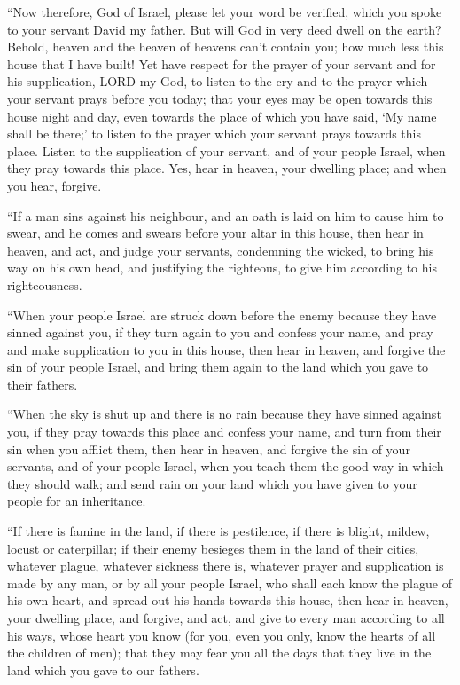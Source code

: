  ``Now therefore, God of Israel, please let your word be
verified, which you spoke to your servant David my father. 
But will God in very deed dwell on the earth? Behold, heaven and the
heaven of heavens can't contain you; how much less this house that I
have built!  Yet have respect for the prayer of your
servant and for his supplication, LORD my God, to listen to the cry and
to the prayer which your servant prays before you today; 
that your eyes may be open towards this house night and day, even
towards the place of which you have said, `My name shall be there;' to
listen to the prayer which your servant prays towards this place.
 Listen to the supplication of your servant, and of your
people Israel, when they pray towards this place. Yes, hear in heaven,
your dwelling place; and when you hear, forgive.

 ``If a man sins against his neighbour, and an oath is laid
on him to cause him to swear, and he comes and swears before your altar
in this house,  then hear in heaven, and act, and judge
your servants, condemning the wicked, to bring his way on his own head,
and justifying the righteous, to give him according to his
righteousness.

 ``When your people Israel are struck down before the enemy
because they have sinned against you, if they turn again to you and
confess your name, and pray and make supplication to you in this house,
 then hear in heaven, and forgive the sin of your people
Israel, and bring them again to the land which you gave to their
fathers.

 ``When the sky is shut up and there is no rain because
they have sinned against you, if they pray towards this place and
confess your name, and turn from their sin when you afflict them,
 then hear in heaven, and forgive the sin of your servants,
and of your people Israel, when you teach them the good way in which
they should walk; and send rain on your land which you have given to
your people for an inheritance.

 ``If there is famine in the land, if there is pestilence,
if there is blight, mildew, locust or caterpillar; if their enemy
besieges them in the land of their cities, whatever plague, whatever
sickness there is,  whatever prayer and supplication is
made by any man, or by all your people Israel, who shall each know the
plague of his own heart, and spread out his hands towards this house,
 then hear in heaven, your dwelling place, and forgive, and
act, and give to every man according to all his ways, whose heart you
know (for you, even you only, know the hearts of all the children of
men);  that they may fear you all the days that they live
in the land which you gave to our fathers.

